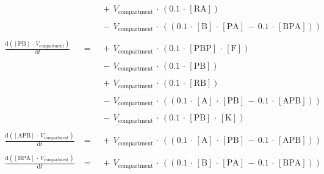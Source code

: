 $$\begin{array}{ccl}
 && \\ 
 \; && \;  { \, + \, {V}_{\mathrm{compartment}} \, \cdot \, \left( {{0.1} \, \cdot \, {\mathrm{[RA]}} } \right) } \\ 
 && \\ 
 \; && \;  { \, - \, {V}_{\mathrm{compartment}} \, \cdot \, \left(\left( {{0.1} \, \cdot \, {\mathrm{[B]}} \, \cdot \, {\mathrm{[PA]}} \, - \, {0.1} \, \cdot \, {\mathrm{[BPA]}} } \right)\right) } \\ 
 && \\ 
\frac {\mathrm{d}\left( {{\mathrm{[PB]}} \, \cdot \, {V}_{\mathrm{compartment}} } \right) }  {\mathrm{d}{t} }  \; &=& \;  { \, + \, {V}_{\mathrm{compartment}} \, \cdot \, \left( {{0.1} \, \cdot \, {\mathrm{[PBP]}} \, \cdot \, {\mathrm{[F]}} } \right) } \\ 
 && \\ 
 \; && \;  { \, - \, {V}_{\mathrm{compartment}} \, \cdot \, \left( {{0.1} \, \cdot \, {\mathrm{[PB]}} } \right) } \\ 
 && \\ 
 \; && \;  { \, + \, {V}_{\mathrm{compartment}} \, \cdot \, \left( {{0.1} \, \cdot \, {\mathrm{[RB]}} } \right) } \\ 
 && \\ 
 \; && \;  { \, - \, {V}_{\mathrm{compartment}} \, \cdot \, \left(\left( {{0.1} \, \cdot \, {\mathrm{[A]}} \, \cdot \, {\mathrm{[PB]}} \, - \, {0.1} \, \cdot \, {\mathrm{[APB]}} } \right)\right) } \\ 
 && \\ 
 \; && \;  { \, - \, {V}_{\mathrm{compartment}} \, \cdot \, \left( {{0.1} \, \cdot \, {\mathrm{[PB]}} \, \cdot \, {\mathrm{[K]}} } \right) } \\ 
 && \\ 
\frac {\mathrm{d}\left( {{\mathrm{[APB]}} \, \cdot \, {V}_{\mathrm{compartment}} } \right) }  {\mathrm{d}{t} }  \; &=& \;  { \, + \, {V}_{\mathrm{compartment}} \, \cdot \, \left(\left( {{0.1} \, \cdot \, {\mathrm{[A]}} \, \cdot \, {\mathrm{[PB]}} \, - \, {0.1} \, \cdot \, {\mathrm{[APB]}} } \right)\right) } \\ 
 && \\ 
\frac {\mathrm{d}\left( {{\mathrm{[BPA]}} \, \cdot \, {V}_{\mathrm{compartment}} } \right) }  {\mathrm{d}{t} }  \; &=& \;  { \, + \, {V}_{\mathrm{compartment}} \, \cdot \, \left(\left( {{0.1} \, \cdot \, {\mathrm{[B]}} \, \cdot \, {\mathrm{[PA]}} \, - \, {0.1} \, \cdot \, {\mathrm{[BPA]}} } \right)\right) } \\ 
 && \\ 

\end{array}$$
